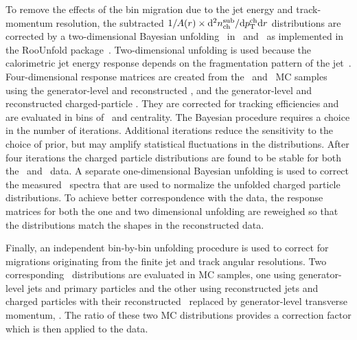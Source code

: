 To remove the effects of the bin migration due to the jet energy and track-momentum resolution, the subtracted $1/A(r) \times \mathrm{d}^2 \mbox{$n_{\mathrm{ch}}^{\mathrm{sub}}$} /\mathrm{d}\mbox{$p_{\mathrm{T}}^{\mathrm{ch}}$} \mathrm{d} r$ distributions are corrected by a two-dimensional Bayesian unfolding~\cite{DAgostini:1994zf}
in \pttrk\ and \ptjet\ as implemented in the RooUnfold package~\cite{Adye:2011gm}.  
Two-dimensional unfolding is used because the calorimetric jet energy response depends on the fragmentation pattern of the jet~\cite{Aad:2011he}.
Four-dimensional response matrices are created from the \pp\ and \pbpb\ MC samples using the generator-level and reconstructed \ptjet, and the generator-level and reconstructed charged-particle \pttrk. They are corrected for tracking efficiencies and are evaluated in bins of \rvar\ and centrality. The Bayesian procedure requires a choice in the number of iterations.
Additional iterations reduce the sensitivity to the choice of prior, but may
amplify statistical fluctuations in the distributions.
After four iterations the 
charged particle distributions are found to be stable for both the \PbPb\ and \pp\ data.
A separate one-dimensional Bayesian unfolding is used to correct the measured \ptjet\ spectra that are used to normalize the unfolded charged particle distributions.
To achieve better correspondence with the data, the response matrices for both the one and two dimensional unfolding are reweighed so that the distributions match the shapes in the reconstructed data.



Finally, an independent bin-by-bin unfolding procedure is used to correct for migrations originating from the finite jet and track angular resolutions. Two corresponding \Dptr\ distributions are evaluated in MC samples, one using generator-level jets and primary particles and the other using reconstructed jets and charged particles with their reconstructed \pttrk\ replaced by generator-level transverse momentum, \pTtrue. The ratio of these two MC distributions provides a correction factor which is then applied to the data. 


